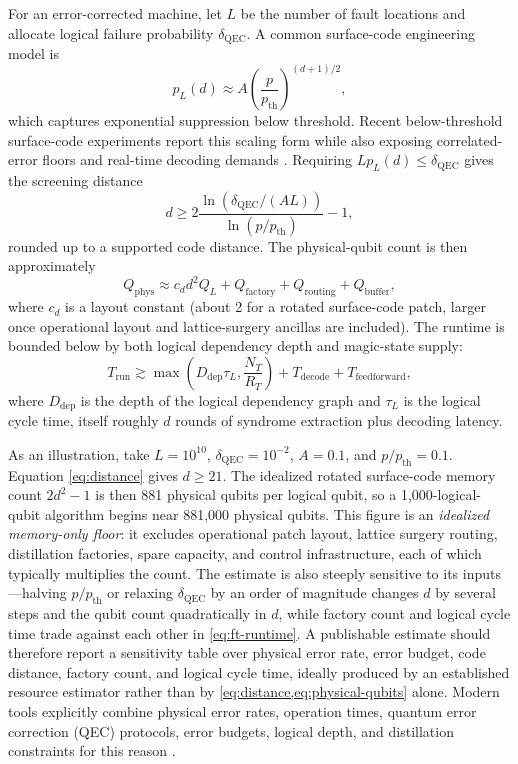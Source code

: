 For an error-corrected machine, let $L$ be the number of fault locations and allocate logical failure probability $\delta_{\mathrm{QEC}}$. A common surface-code engineering model is
\begin{equation}
p_L(d)\approx A\left(\frac{p}{p_{\mathrm{th}}}\right)^{(d+1)/2},
\label{eq:logical-error}
\end{equation}
which captures exponential suppression below threshold. Recent below-threshold surface-code experiments report this scaling form while also exposing correlated-error floors and real-time decoding demands \citep{acharya2025}. Requiring $L p_L(d)\leq\delta_{\mathrm{QEC}}$ gives the screening distance
\begin{equation}
d\geq
2\frac{\ln\!\left(\delta_{\mathrm{QEC}}/(A L)\right)}
{\ln\!\left(p/p_{\mathrm{th}}\right)}-1,
\label{eq:distance}
\end{equation}
rounded up to a supported code distance. The physical-qubit count is then approximately
\begin{equation}
Q_{\mathrm{phys}}
\approx c_d d^2 Q_L+Q_{\mathrm{factory}}+Q_{\mathrm{routing}}+Q_{\mathrm{buffer}},
\label{eq:physical-qubits}
\end{equation}
where $c_d$ is a layout constant (about 2 for a rotated surface-code patch, larger once operational layout and lattice-surgery ancillas are included). The runtime is bounded below by both logical dependency depth and magic-state supply:
\begin{equation}
T_{\mathrm{run}}\gtrsim
\max\!\left(D_{\mathrm{dep}}\tau_L,\frac{N_T}{R_T}\right)
+T_{\mathrm{decode}}+T_{\mathrm{feedforward}},
\label{eq:ft-runtime}
\end{equation}
where $D_{\mathrm{dep}}$ is the depth of the logical dependency graph and $\tau_L$ is the logical cycle time, itself roughly $d$ rounds of syndrome extraction plus decoding latency.

As an illustration, take $L=10^{10}$, $\delta_{\mathrm{QEC}}=10^{-2}$, $A=0.1$, and $p/p_{\mathrm{th}}=0.1$. Equation \eqref{eq:distance} gives $d\geq21$. The idealized rotated surface-code memory count $2d^2-1$ is then 881 physical qubits per logical qubit, so a 1,000-logical-qubit algorithm begins near 881,000 physical qubits. This figure is an \emph{idealized memory-only floor}: it excludes operational patch layout, lattice surgery routing, distillation factories, spare capacity, and control infrastructure, each of which typically multiplies the count. The estimate is also steeply sensitive to its inputs---halving $p/p_{\mathrm{th}}$ or relaxing $\delta_{\mathrm{QEC}}$ by an order of magnitude changes $d$ by several steps and the qubit count quadratically in $d$, while factory count and logical cycle time trade against each other in \cref{eq:ft-runtime}. A publishable estimate should therefore report a sensitivity table over physical error rate, error budget, code distance, factory count, and logical cycle time, ideally produced by an established resource estimator rather than by \cref{eq:distance,eq:physical-qubits} alone. Modern tools explicitly combine physical error rates, operation times, quantum error correction (QEC) protocols, error budgets, logical depth, and distillation constraints for this reason \citep{beverland2022,vandam2024}.


